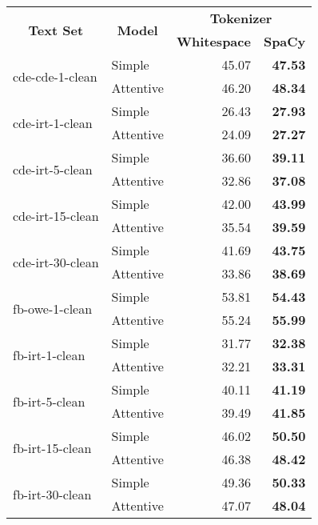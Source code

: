 \begin{tabular}{| l | l | r | r |}
    \hline

    \multicolumn{1}{|c|}{\multirow{2}{*}{\textbf{Text Set}}} &
    \multicolumn{1}{|c|}{\multirow{2}{*}{\textbf{Model}}} &
    \multicolumn{2}{|c|}{\textbf{Tokenizer}} \\

    &
    &
    \multicolumn{1}{|c|}{\textbf{Whitespace}} &
    \multicolumn{1}{|c|}{\textbf{SpaCy}} \\

    \hline \hline

    \multirow{2}{*}{cde-cde-1-clean}
    & Simple    & 45.07 & \textbf{47.53} \\
    & Attentive & 46.20 & \textbf{48.34} \\ \hline

    \multirow{2}{*}{cde-irt-1-clean}
    & Simple    & 26.43 & \textbf{27.93} \\
    & Attentive & 24.09 & \textbf{27.27} \\ \hline

    \multirow{2}{*}{cde-irt-5-clean}
    & Simple    & 36.60 & \textbf{39.11} \\
    & Attentive & 32.86 & \textbf{37.08} \\ \hline

    \multirow{2}{*}{cde-irt-15-clean}
    & Simple    & 42.00 & \textbf{43.99} \\
    & Attentive & 35.54 & \textbf{39.59} \\ \hline

    \multirow{2}{*}{cde-irt-30-clean}
    & Simple    & 41.69 & \textbf{43.75} \\
    & Attentive & 33.86 & \textbf{38.69} \\ \hline \hline

    \multirow{2}{*}{fb-owe-1-clean}
    & Simple    & 53.81 & \textbf{54.43} \\
    & Attentive & 55.24 & \textbf{55.99} \\ \hline

    \multirow{2}{*}{fb-irt-1-clean}
    & Simple    & 31.77 & \textbf{32.38} \\
    & Attentive & 32.21 & \textbf{33.31} \\ \hline

    \multirow{2}{*}{fb-irt-5-clean}
    & Simple    & 40.11 & \textbf{41.19} \\
    & Attentive & 39.49 & \textbf{41.85} \\ \hline

    \multirow{2}{*}{fb-irt-15-clean}
    & Simple    & 46.02 & \textbf{50.50} \\
    & Attentive & 46.38 & \textbf{48.42} \\ \hline

    \multirow{2}{*}{fb-irt-30-clean}
    & Simple    & 49.36 & \textbf{50.33} \\
    & Attentive & 47.07 & \textbf{48.04} \\ \hline

\end{tabular}
